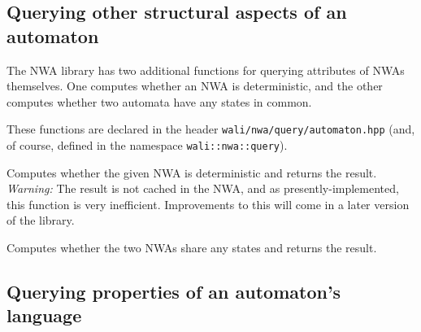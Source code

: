 




\subsection{Querying other structural aspects of an automaton}
\label{Se:query-automaton}

The NWA library has two additional functions for querying attributes
of NWAs themselves. One computes whether an NWA is deterministic, and
the other computes whether two automata have any states in common.

These functions are declared in the header
\texttt{wali/nwa/query/automaton.hpp} (and, of course, defined in the
namespace \texttt{wali::nwa::query}).

\begin{functionlist}
    Computes whether the given NWA is deterministic and returns the
    result. \textit{Warning:} The result is not cached in the NWA, and
    as presently-implemented, this function is very
    inefficient. Improvements to this will come in a later version of
    the library.

    Computes whether the two NWAs share any states and returns the
    result.
\end{functionlist}


\subsection{Querying properties of an automaton's language}
\label{Se:query-language}


